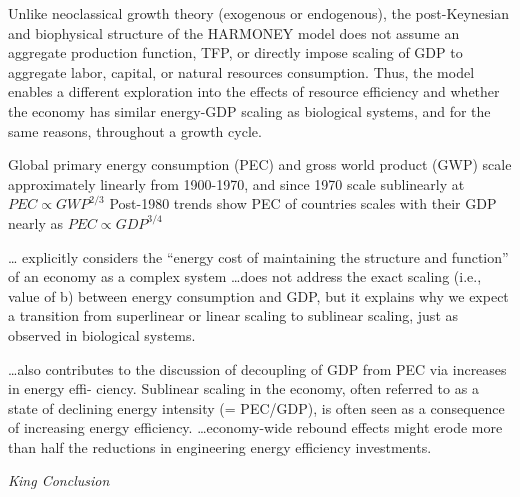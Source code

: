 \documentclass[
]{book}
\begin{document}
Unlike neoclassical growth theory (exogenous or endogenous),
the post-Keynesian and biophysical structure of the
HARMONEY model does not assume an aggregate production function, TFP,
or directly impose scaling of GDP
to aggregate labor, capital, or natural resources consumption.
Thus, the model enables a different exploration into
the effects of resource efficiency and whether the economy
has similar energy-GDP scaling as biological systems, and
for the same reasons, throughout a growth cycle.

Global primary energy consumption (PEC) and gross world product (GWP)
scale approximately linearly from 1900-1970,
and since 1970 scale sublinearly at \(PEC ∝ GWP^{2/3}\)
Post-1980 trends show PEC of countries scales with their GDP
nearly as \(PEC ∝ GDP^{3/4}\)

\ldots{} explicitly
considers the ``energy cost of maintaining the structure and
function'' of an economy as a complex system
\ldots does not address the exact scaling (i.e., value of b) between
energy consumption and GDP, but it explains why we expect
a transition from superlinear or linear scaling to sublinear
scaling, just as observed in biological systems.

\ldots also contributes to the discussion of
decoupling of GDP from PEC via increases in energy effi-
ciency. Sublinear scaling in the economy, often referred to
as a state of declining energy intensity (= PEC/GDP), is
often seen as a consequence of increasing energy efficiency.
\ldots economy-wide
rebound effects might erode more than half the reductions in
engineering energy efficiency investments.

\emph{King Conclusion}
\end{document}
